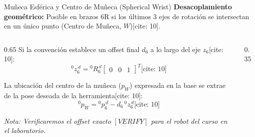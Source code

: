 \documentclass[aspectratio=169, xcolor={table,xcdraw}]{beamer}
\begin{document}
\begin{frame}{Muñeca Esférica y Centro de Muñeca (Spherical Wrist)}
    \textbf{Desacoplamiento geométrico:} Posible en brazos 6R si los últimos 3 ejes de rotación se intersectan en un único punto (Centro de Muñeca, $W$)[cite: 10].
    
    \begin{columns}[T]
        \begin{column}{0.65\textwidth}
            \small
            \vspace{0.4cm}
            Si la convención establece un offset final $d_6$ a lo largo del eje $z_6$[cite: 10]:
            \begin{equation*}
                {}^{0}z_6^{\,d} = {}^{0}R_6^{\,d} \begin{bmatrix} 0 & 0 & 1 \end{bmatrix}^T \text{[cite: 10]}
            \end{equation*}
            
            La ubicación del centro de la muñeca ($p_W$) expresada en la base se extrae de la pose deseada de la herramienta[cite: 10]:
            \begin{equation*}
                \boxed{{}^{0}p_W = {}^{0}p_6^{\,d} - d_6\,{}^{0}z_6^{\,d}} \text{[cite: 10]}
            \end{equation*}
            
            \scriptsize \textit{Nota: Verificaremos el offset exacto $[VERIFY]$ para el robot del curso en el laboratorio.}
        \end{column}
        \begin{column}{0.35\textwidth}
            \centering
            \vspace{0.4cm}
        \end{column}
    \end{columns}
\end{frame}
\end{document}

